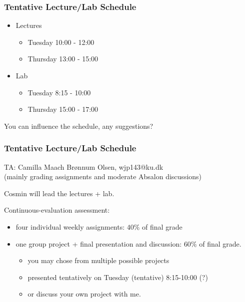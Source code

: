 \documentclass{beamer}
\begin{document}
\begin{frame}[fragile]
\frametitle{Tentative Lecture/Lab Schedule}
    \begin{itemize}
        \item Lectures\medskip
            \begin{itemize}
                \item Tuesday  10:00 - 12:00\medskip
                \item Thursday 13:00 - 15:00
            \end{itemize} \bigskip
        \item Lab\medskip
            \begin{itemize}
                \item Tuesday   8:15  - 10:00\medskip
                \item Thursday  15:00 - 17:00
            \end{itemize}
    \end{itemize}
\bigskip

You can influence the schedule, any suggestions?
\end{frame}

\begin{frame}[fragile]
\frametitle{Tentative Lecture/Lab Schedule}

TA: Camilla Maach Brønnum Olsen,    wjp143@ku.dk\\
(mainly grading assignments and moderate Absalon discussions)\bigskip

Cosmin will lead the lectures + lab.\bigskip

Continuous-evaluation assessment:
\begin{itemize}
    \item four individual weekly assignments: $40\%$ of final grade\medskip
    \item one group project + final presentation and discussion: $60\%$ of final grade.
        \begin{itemize}
            \item you may chose from multiple possible projects
            \item presented tentatively on Tuesday (tentative) 8:15-10:00 (?)
            \item or discuss your own project with me.
        \end{itemize}
\end{itemize} 
\end{frame}
\end{document}
